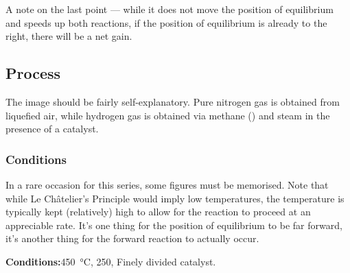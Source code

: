 			A note on the last point --- while it does not move the position of equilibrium and speeds up both reactions, if the
			position of equilibrium is already to the right, there will be a net gain.



		\pagebreak
		\subsection{Process}


			The image should be fairly self-explanatory. Pure nitrogen gas is obtained from liquefied air, while hydrogen gas is obtained
			via methane () and steam in the presence of a catalyst.

			\subsubsection{Conditions}

				In a rare occasion for this series, some figures must be memorised. Note that while Le Châtelier's Principle would imply
				low temperatures, the temperature is typically kept (relatively) high to allow for the reaction to proceed at an appreciable
				rate. It's one thing for the position of equilibrium to be far forward, it's another thing for the forward reaction to
				actually occur.

				\vspace{1.5em}
				\vbox{\textbf{Conditions:}\tabto{35mm}\SI{450}{\celsius}, \SI{250}{\atm}, Finely divided  catalyst.}




















